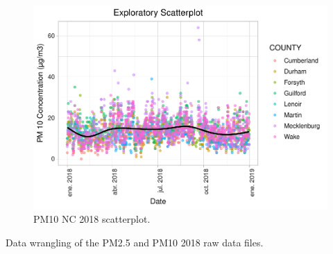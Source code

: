 \documentclass[12pt,]{article}
\begin{document}
\begin{figure}
\centering
\includegraphics{Raby_ENV872_Project_files/figure-latex/unnamed-chunk-14-1.pdf}
\caption{PM10 NC 2018 scatterplot. \label{PM10_scatterplot}}
\end{figure}

Data wrangling of the PM2.5 and PM10 2018 raw data files.
\end{document}

